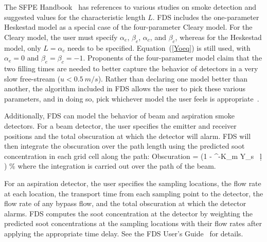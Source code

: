 The SFPE Handbook~\cite{SFPE} has references to various studies on smoke detection and suggested values for the characteristic length $L$. FDS includes the one-parameter Heskestad model as a special case of the four-parameter Cleary model. For the Cleary model, the user must specify $\alpha_e$, $\beta_e$, $\alpha_c$, and $\beta_c$, whereas for the Heskestad model, only $L=\alpha_c$ needs to be specified. Equation~(\ref{Yoeq}) is still used, with $\alpha_e=0$ and $\beta_e=\beta_c=-1$. Proponents of the four-parameter model claim that the two filling times are needed to better capture the behavior of detectors in a very slow free-stream ($u<\SI{0.5}{m/s}$). Rather than declaring one model better than another, the algorithm included in FDS allows the user to pick these various parameters, and in doing so, pick whichever model the user feels is appropriate~\cite{CSE_GCR}.

Additionally, FDS can model the behavior of beam and aspiration smoke detectors.  For a beam detector, the user specifies the emitter and receiver positions and the total obscuration at which the detector will alarm.  FDS will then integrate the obscuration over the path length using the predicted soot concentration in each grid cell along the path:
\be
  \hbox{Obscuration}  = \left(1 - ^{-K_m \int \rho Y_s \, \d l }  \right)   \; \; \hbox{\%}
\ee
where the integration is carried out over the path of the beam.

For an aspiration detector, the user specifies the sampling locations, the flow rate at each location, the transport time from each sampling point to the detector, the flow rate of any bypass flow, and the total obscuration at which the detector alarms.  FDS computes the soot concentration at the detector by weighting the predicted soot concentrations at the sampling locations with their flow rates after applying the appropriate time delay. See the FDS User's Guide~\cite{FDS_Users_Guide} for details.

